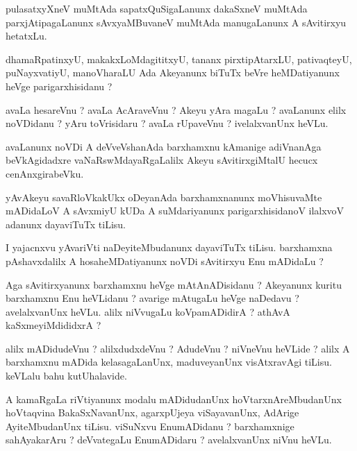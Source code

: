 \documentclass{article}
\begin{document}
\begin{mn}
pulasatxyXneV  muMtAda  sapatxQuSigaLanunx dakaSxneV  muMtAda parxjAtipagaLanunx 
sAvxyaMBuvaneV  muMtAda manugaLanunx A  sAvitirxyu hetatxLu.
\end{mn}

\begin{mn}
dhamaRpatinxyU,  makakxLoMdagititxyU,  tananx pirxtipAtarxLU, pativaqteyU, puNayxvatiyU, 
manoVharaLU  Ada Akeyanunx  biTuTx beVre heMDatiyanunx heVge parigarxhisidanu ? 
\end{mn}

\begin{mn}
avaLa hesareVnu ?  avaLa AcAraveVnu ?  Akeyu yAra magaLu ?  avaLanunx elilx noVDidanu ?  
yAru toVrisidaru ?  avaLa rUpaveVnu ?  ivelalxvanUnx  heVLu.
\end{mn}

\begin{mn}
avaLanunx noVDi A deVveVshanAda barxhamxnu kAmanige adiVnanAga beVkAgidadxre 
vaNaRswMdayaRgaLalilx Akeyu sAvitirxgiMtalU  hecucx cenAnxgirabeVku.
\end{mn}

\begin{mn}
yAvAkeyu savaRloVkakUkx oDeyanAda barxhamxnanunx moVhisuvaMte mADidaLoV A sAvxmiyU 
kUDa A suMdariyanunx parigarxhisidanoV ilalxvoV adanunx dayaviTuTx tiLisu.
\end{mn}

\begin{mn}
I yajacnxvu yAvariVti naDeyiteMbudanunx dayaviTuTx tiLisu.  barxhamxna  pAshavxdalilx 
A hosaheMDatiyanunx  noVDi  sAvitirxyu Enu mADidaLu ?
\end{mn}

\begin{mn}
Aga sAvitirxyanunx barxhamxnu  heVge mAtAnADisidanu ?   Akeyanunx kuritu barxhamxnu Enu 
heVLidanu ?  avarige mAtugaLu heVge naDedavu ?  avelalxvanUnx  heVLu.  alilx  niVvugaLu 
koVpamADidirA ?  athAvA  kaSxmeyiMdididxrA ?
\end{mn}

\begin{mn}
alilx mADidudeVnu ?   alilxdudxdeVnu ?  AdudeVnu ?   niVneVnu  heVLide ?   alilx A barxhamxnu 
mADida kelasagaLanUnx,  maduveyanUnx visAtxravAgi tiLisu.  keVLalu  bahu kutUhalavide.
\end{mn}

\begin{mn}
A kamaRgaLa riVtiyanunx modalu mADidudanUnx hoVtarxnAreMbudanUnx  hoVtaqvina BakaSxNavanUnx,  
agarxpUjeya viSayavanUnx, AdArige AyiteMbudanUnx  tiLisu.  viSuNxvu EnumADidanu ?  
barxhamxnige  sahAyakarAru ?  deVvategaLu EnumADidaru ?  avelalxvanUnx  niVnu  heVLu.
\end{mn}
\end{document}
